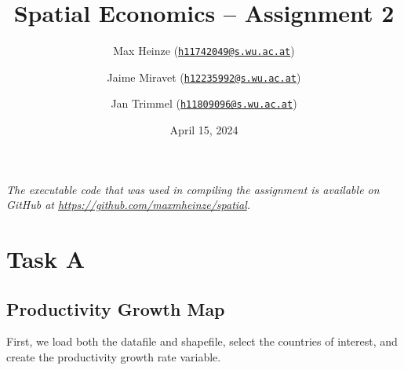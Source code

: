 \documentclass[
  a4paper,
]{article}
\title{\textbf{Spatial Economics -- Assignment 2}}
\author{Max Heinze
(\href{mailto:h11742049@s.wu.ac.at}{\nolinkurl{h11742049@s.wu.ac.at}}) \and Jaime
Miravet
(\href{mailto:h12235992@s.wu.ac.at}{\nolinkurl{h12235992@s.wu.ac.at}}) \and Jan
Trimmel
(\href{mailto:h11809096@s.wu.ac.at}{\nolinkurl{h11809096@s.wu.ac.at}})}
\date{April 15, 2024}
\begin{document}
\maketitle

{
\hypersetup{linkcolor=}
\setcounter{tocdepth}{2}
\tableofcontents
}
\vspace{2em}

\begin{tcolorbox}
\centering \itshape The executable code that was used in compiling the assignment is available on GitHub at \url{https://github.com/maxmheinze/spatial}.
\end{tcolorbox}

\newpage

\section{Task A}\label{task-a}

\subsection{Productivity Growth Map}\label{productivity-growth-map}

First, we load both the datafile and shapefile, select the countries of
interest, and create the productivity growth rate variable.
\end{document}
